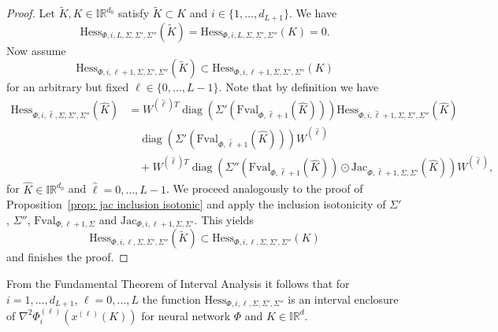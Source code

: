 \documentclass[a4paper, 11pt]{article}
\begin{document}
	\begin{proof}
		Let $\tilde{K},K \in \mathbb{IR}^{d_0}$ satisfy $\tilde{K} \subset K$ and $i \in \{1, \dotsc, d_{L+1}\}$. We have
		$$ \mathrm{Hess}_{\Phi,i,L, \Sigma, \Sigma', \Sigma''}(\tilde{K}) = \mathrm{Hess}_{\Phi,i,L, \Sigma, \Sigma', \Sigma''}({K}) = 0. $$
		Now assume
		\begin{equation}\label{eq: hess induction hypothesis}
			\mathrm{Hess}_{\Phi, i,\ell+1, \Sigma, \Sigma', \Sigma''}(\tilde{K}) \subset \mathrm{Hess}_{\Phi, i,\ell+1, \Sigma, \Sigma', \Sigma''}(K)
		\end{equation}
		for an arbitrary but fixed $\ell \in \{0, \dotsc, L-1\}$. Note that by definition we have
		\begin{equation}\label{eq: algo hess recursion}
			\begin{aligned}
				\mathrm{Hess}_{\Phi, i,\hat{\ell}, \Sigma, \Sigma', \Sigma''}(\hat{K})
				&= W^{(\hat{\ell})T} \operatorname{diag}\left( \Sigma'(\mathrm{Fval}_{\Phi, \hat{\ell}+1}(\hat{K}))\right)  \mathrm{Hess}_{\Phi, i,\hat{\ell}+1, \Sigma, \Sigma', \Sigma''}(\hat{K}) \\
				&\quad  \operatorname{diag}\left( \Sigma'(\mathrm{Fval}_{\Phi, \hat{\ell}+1}(\hat{K}))\right) W^{(\hat{\ell})}\\
				&\quad + W^{(\hat{\ell})T}  \operatorname{diag}\left(\Sigma'' (\mathrm{Fval}_{\Phi, \hat{\ell}+1}(\hat{K})) \odot \mathrm{Jac}_{\Phi, \hat{\ell}+1, \Sigma, \Sigma'}(\hat{K})\right)  W^{(\hat{\ell})},
			\end{aligned}
		\end{equation}
		for $\hat{K}\in \mathbb{IR}^{d_0}$ and $\hat{\ell} = 0, \dotsc, L-1$. We proceed analogously to the proof of Proposition~\ref{prop: jac inclusion isotonic} and apply the inclusion isotonicity of $\Sigma'$, $\Sigma''$, $\mathrm{Fval}_{\Phi, \ell+1, \Sigma}$ and $\mathrm{Jac}_{\Phi,i, \ell+1, \Sigma, \Sigma'}$. This yields
		$$  \mathrm{Hess}_{\Phi, i,\ell, \Sigma, \Sigma', \Sigma''}(\tilde{K}) \subset \mathrm{Hess}_{\Phi, i,\ell, \Sigma, \Sigma', \Sigma''}(K) $$
		and finishes the proof.
	\end{proof}
	
	From the Fundamental Theorem of Interval Analysis it follows that for $i=1, \dotsc, d_{L+1}$, $\ell=0,\dotsc,L$ the function $\mathrm{Hess}_{\Phi,i,\ell, \Sigma, \Sigma', \Sigma''}$ is an interval enclosure of $\nabla^2\Phi_i^{(\ell)}(x^{(\ell)}(K))$ for neural network $\Phi$ and $K \in \mathbb{IR}^d$.
	
\end{document}
